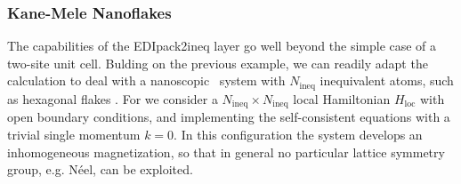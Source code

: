 \documentclass[edipack_sp.tex]{subfiles}
\begin{document}
\subsubsection{Kane-Mele Nanoflakes}
The capabilities of the EDIpack2ineq layer go well beyond the
simple case of a two-site unit cell. Bulding on the previous example, we can readily adapt the calculation to deal with a nanoscopic~\cite{Amaricci2014PRA} system with $N_\mathrm{ineq}$ inequivalent atoms, such as hexagonal flakes
\cite{Valli2016PRB,Valli2018NL}.
For we consider a 
$N_\mathrm{ineq}\times N_\mathrm{ineq}$ local Hamiltonian 
$H_\mathrm{loc}$ with open boundary conditions, and implementing
the self-consistent equations with a trivial single momentum 
$k=0$. In this configuration the system develops an inhomogeneous magnetization, so that in general no particular lattice symmetry group, e.g. N\'eel, can be exploited. 
\end{document}
